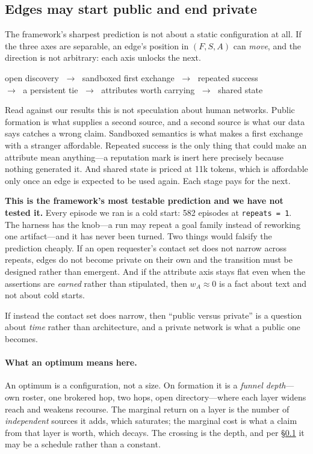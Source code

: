 \else
\subsection{Edges may start public and end private}
\label{sec:lifecycle}

The framework's sharpest prediction is not about a static configuration at all. If the
three axes are separable, an edge's position in $(F,S,A)$ can \emph{move}, and the
direction is not arbitrary: each axis unlocks the next.

\begin{center}\small
open discovery $\;\rightarrow\;$ sandboxed first exchange $\;\rightarrow\;$ repeated success\\[2pt]
$\rightarrow\;$ a persistent tie $\;\rightarrow\;$ attributes worth carrying $\;\rightarrow\;$ shared state
\end{center}

Read against our results this is not speculation about human networks. Public formation is
what supplies a second source, and a second source is what our data says catches a wrong
claim. Sandboxed semantics is what makes a first exchange with a stranger affordable.
Repeated success is the only thing that could make an attribute mean anything---a
reputation mark is inert here precisely because nothing generated it. And shared state is
priced at 11k tokens, which is affordable only once an edge is expected to be used again.
Each stage pays for the next.

\textbf{This is the framework's most testable prediction and we have not tested it.} Every
episode we ran is a cold start: 582 episodes at \texttt{repeats = 1}. The harness has the
knob---a run may repeat a goal family instead of reworking one artifact---and it has never
been turned. Two things would falsify the prediction cheaply. If an open requester's
contact set does not narrow across repeats, edges do not become private on their own and
the transition must be designed rather than emergent. And if the attribute axis stays flat
even when the assertions are \emph{earned} rather than stipulated, then $w_A \approx 0$ is
a fact about text and not about cold starts.

If instead the contact set does narrow, then ``public versus private'' is a question about
\emph{time} rather than architecture, and a private network is what a public one becomes.

\fi

\ifcompact
\paragraph{What an optimum means here.} An optimum is a configuration, not a size. On
formation it is a \emph{funnel depth}---own roster, one brokered hop, two hops, open
directory---where each layer widens reach and weakens recourse. The marginal return on a
layer is the number of \emph{independent} sources it adds, which saturates; the marginal
cost is what a claim from that layer is worth, which decays. The crossing is the depth, and
per \S\ref{sec:lifecycle} it may be a schedule rather than a constant.
\else
